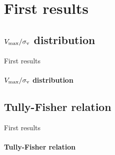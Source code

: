 \documentclass[usenames,dvipsnames]{beamer}
\begin{document}
\section{First results}
\subsection{$V_{\rm{max}}/\sigma_{\rm{v}}$ distribution}
\begin{frame}{First results}
	\framesubtitle{$V_{\rm{max}}/\sigma_{\rm{v}}$ distribution}

\end{frame}

\subsection{Tully-Fisher relation}
\begin{frame}{First results}
	\framesubtitle{Tully-Fisher relation}
\end{frame}
\end{document}
